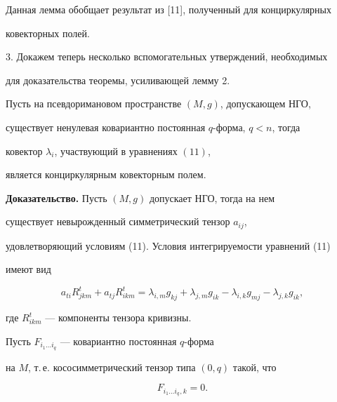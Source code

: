 \begin{note}


Данная лемма обобщает результат из [11], полученный для конциркулярных 


ковекторных полей.


\end{note}





3. Докажем теперь несколько вспомогательных утверждений, необходимых 


для доказательства теоремы, усиливающей лемму 2.





\begin{lem}


Пусть на псевдоримановом пространстве $(M,g)$, допускающем НГО, 


существует ненулевая ковариантно постоянная $q$-форма, $q<n$, тогда 


ковектор $\lambda_i$, участвующий в уравнениях $(11)$,


является конциркулярным ковекторным полем.


\end{lem}





{\bf Доказательство.} Пусть $(M, g)$ допускает НГО, тогда на нем 


существует невырожденный симметрический тензор $a_{ij}$, 


удовлетворяющий условиям (11). Условия интегрируемости уравнений (11)


имеют вид


\begin{equation}


a_{ti}R^t_{jkm} + a_{tj}R^t_{ikm}=


\lambda_{i,m}{g_{kj}} + \lambda_{j,m}g_{ik}


- \lambda_{i,k}g_{mj}- \lambda_{j,k}g_{ik},


\end{equation} 


где $R^t_{ikm}$ --- компоненты тензора кривизны.


Пусть $F_{i_1\dotsc i_q}$ --- ковариантно постоянная $q$-форма


на $M$, т.\,е. кососимметрический тензор типа $(0, q)$ такой, что


\begin{equation}


F_{i_1\dotsc i_q}{}_{,k} =0.


\end{equation}


